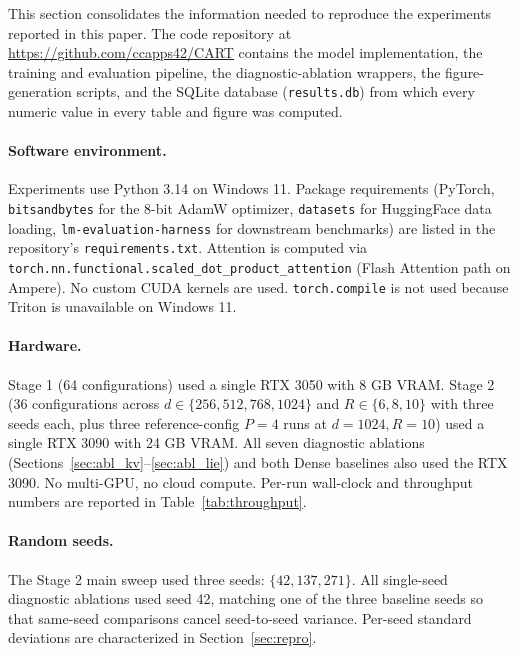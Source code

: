 \documentclass{article}
\begin{document}
This section consolidates the information needed to reproduce the experiments reported in this paper. The code repository at \url{https://github.com/ccapps42/CART} contains the model implementation, the training and evaluation pipeline, the diagnostic-ablation wrappers, the figure-generation scripts, and the SQLite database (\texttt{results.db}) from which every numeric value in every table and figure was computed.

\paragraph{Software environment.}
Experiments use Python 3.14 on Windows 11. Package requirements (PyTorch, \texttt{bitsandbytes} for the 8-bit AdamW optimizer, \texttt{datasets} for HuggingFace data loading, \texttt{lm-evaluation-harness} for downstream benchmarks) are listed in the repository's \texttt{requirements.txt}. Attention is computed via \texttt{torch.nn.functional.scaled\_dot\_product\_attention} (Flash Attention path on Ampere). No custom CUDA kernels are used. \texttt{torch.compile} is not used because Triton is unavailable on Windows 11.

\paragraph{Hardware.}
Stage 1 (64 configurations) used a single RTX 3050 with 8 GB VRAM. Stage 2 (36 configurations across $d \in \{256, 512, 768, 1024\}$ and $R \in \{6, 8, 10\}$ with three seeds each, plus three reference-config $P{=}4$ runs at $d{=}1024, R{=}10$) used a single RTX 3090 with 24 GB VRAM. All seven diagnostic ablations (Sections~\ref{sec:abl_kv}--\ref{sec:abl_lie}) and both Dense baselines also used the RTX 3090. No multi-GPU, no cloud compute. Per-run wall-clock and throughput numbers are reported in Table~\ref{tab:throughput}.

\paragraph{Random seeds.}
The Stage 2 main sweep used three seeds: $\{42, 137, 271\}$. All single-seed diagnostic ablations used seed 42, matching one of the three baseline seeds so that same-seed comparisons cancel seed-to-seed variance. Per-seed standard deviations are characterized in Section~\ref{sec:repro}.
\end{document}

